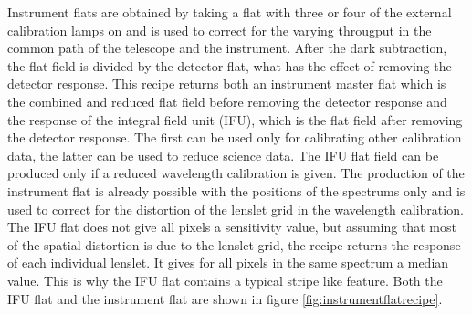 \documentclass[twoside,single]{lion-msc}
\begin{document}
Instrument flats are obtained by taking a flat with three or four of the external calibration lamps on and is used to correct for the varying througput in the common path of the telescope and the instrument. After the dark subtraction, the flat field is divided by the detector flat, what has the effect of removing the detector response. This recipe returns both an instrument master flat which is the combined and reduced flat field before removing the detector response and the response of the integral field unit (IFU), which is the flat field after removing the detector response. The first can be used only for calibrating other calibration data, the latter can be used to reduce science data. The IFU flat field can be produced only if a reduced wavelength calibration is given. The production of the instrument flat is already possible with the positions of the spectrums only and is used to correct for the distortion of the lenslet grid in the wavelength calibration. The IFU flat does not give all pixels a sensitivity value, but assuming that most of the spatial distortion is due to the lenslet grid, the recipe returns the response of each individual lenslet. It gives for all pixels in the same spectrum a median value. This is why the IFU flat contains a typical stripe like feature. Both the IFU flat and the instrument flat are shown in figure \ref{fig:instrumentflatrecipe}. 
\end{document}
